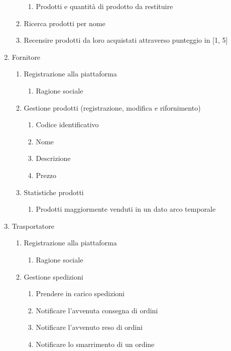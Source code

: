 \documentclass[12pt]{report}
\begin{document}
\begin{enumerate}
\begin{enumerate}
\begin{enumerate}
                        \item Prodotti e quantità di prodotto da restituire
                    \end{enumerate}
                \item Ricerca prodotti per nome
                \item Recensire prodotti da loro acquistati attraverso punteggio in [1, 5]
            \end{enumerate}
        \item Fornitore
            \begin{enumerate}
                \item Registrazione alla piattaforma
                    \begin{enumerate}
                        \item Ragione sociale
                    \end{enumerate}
                \item Gestione prodotti (registrazione, modifica e rifornimento)
                    \begin{enumerate}
                        \item Codice identificativo
                        \item Nome
                        \item Descrizione
                        \item Prezzo
                    \end{enumerate}
                \item Statistiche prodotti
                    \begin{enumerate}
                        \item Prodotti maggiormente venduti in un dato arco temporale
                    \end{enumerate}
            \end{enumerate}
        \item Trasportatore
            \begin{enumerate}
                \item Registrazione alla piattaforma
                    \begin{enumerate}
                        \item Ragione sociale
                    \end{enumerate}
                \item Gestione spedizioni
                    \begin{enumerate}
                        \item Prendere in carico spedizioni
                        \item Notificare l'avvenuta consegna di ordini
                        \item Notificare l'avvenuto reso di ordini
                        \item Notificare lo smarrimento di un ordine
                    \end{enumerate}
            \end{enumerate}
    \end{enumerate}
\end{document}

